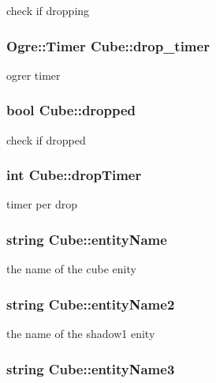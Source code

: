 check if dropping \hypertarget{class_cube_ad3bb6ae7badac1e670fcf162a8221066}{
\subsubsection[{drop\-\_\-timer}]{\setlength{\rightskip}{0pt plus 5cm}Ogre\-::\-Timer Cube\-::drop\-\_\-timer}}\label{class_cube_ad3bb6ae7badac1e670fcf162a8221066}
ogrer timer \hypertarget{class_cube_a5b1c8da973a047c5cc5989c105b1f642}{
\subsubsection[{dropped}]{\setlength{\rightskip}{0pt plus 5cm}bool Cube\-::dropped}}\label{class_cube_a5b1c8da973a047c5cc5989c105b1f642}
check if dropped \hypertarget{class_cube_a0b3149f410be4e58a6ff7f8fd65cfb27}{
\subsubsection[{drop\-Timer}]{\setlength{\rightskip}{0pt plus 5cm}int Cube\-::drop\-Timer\hspace{0.3cm}{\ttfamily [private]}}}\label{class_cube_a0b3149f410be4e58a6ff7f8fd65cfb27}
timer per drop \hypertarget{class_cube_a30a863d3f3d7048207a90903e961c208}{
\subsubsection[{entity\-Name}]{\setlength{\rightskip}{0pt plus 5cm}string Cube\-::entity\-Name}}\label{class_cube_a30a863d3f3d7048207a90903e961c208}
the name of the cube enity \hypertarget{class_cube_a724c741e2b66fca73a76de2b644a80e8}{
\subsubsection[{entity\-Name2}]{\setlength{\rightskip}{0pt plus 5cm}string Cube\-::entity\-Name2}}\label{class_cube_a724c741e2b66fca73a76de2b644a80e8}
the name of the shadow1 enity \hypertarget{class_cube_ab9ed6ed2275f2e1a67ee13aa916ba6ea}{
\subsubsection[{entity\-Name3}]{\setlength{\rightskip}{0pt plus 5cm}string Cube\-::entity\-Name3}}\label{class_cube_ab9ed6ed2275f2e1a67ee13aa916ba6ea}
